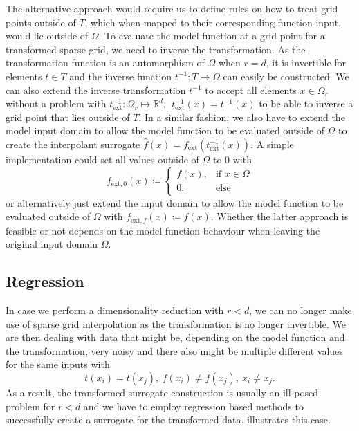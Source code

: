 \documentclass[
  a4paper,  %
  twoside,  %
  bibliography=totoc,
  headsepline,
  cleardoublepage=empty,
  parskip=half,
  draft=false
]{scrbook}
\begin{document}
The alternative approach would require us to define rules on how to treat grid points outside of $T$, which when mapped to their corresponding function input, would lie outside of $\Omega$.
To evaluate the model function at a grid point for a transformed sparse grid, we need to inverse the transformation.
As the transformation function is an automorphism of $\Omega$ when $r=d$, it is invertible for elements $t \in T$ and the inverse function $t^{-1} \colon T \mapsto \Omega$ can easily be constructed.
We can also extend the inverse transformation $t^{-1}$ to accept all elements $x \in \Omega_r$ without a problem with $t^{-1}_{\text{ext}} \colon \Omega_r \mapsto \mathds{R}^d, ~~ t^{-1}_{\text{ext}}(x)=t^{-1}(x)$ to be able to inverse a grid point that lies outside of $T$.
In a similar fashion, we also have to extend the model input domain to allow the model function to be evaluated outside of $\Omega$ to create the interpolant surrogate $\hat{f}(x)=f_\text{ext}(t^{-1}_{\text{ext}}(x))$.
A simple implementation could set all values outside of $\Omega$ to 0 with
\begin{equation}
f_{\text{ext}, 0}(x) \coloneqq \begin{cases}
f(x), &\text{if $x \in \Omega$}\\
0, &\text{else}
\end{cases}
\end{equation}
or alternatively just extend the input domain to allow the model function to be evaluated outside of $\Omega$ with $f_{\text{ext}, f}(x) \coloneqq f(x)$.
Whether the latter approach is feasible or not depends on the model function behaviour when leaving the original input domain $\Omega$.

\subsection{Regression}
In case we perform a dimensionality reduction with $r < d$, we can no longer make use of sparse grid interpolation as the transformation is no longer invertible.
We are then dealing with data that might be, depending on the model function and the transformation, very noisy and there also might be multiple different values for the same inputs with
\begin{equation}
t(x_i)=t(x_j), ~ f(x_i) \neq f(x_j), ~ x_i \neq x_j.
\end{equation}
As a result, the transformed surrogate construction is usually an ill-posed problem for $r < d$ and we have to employ regression based methods to successfully create a surrogate for the transformed data.
 illustrates this case.
\end{document}
